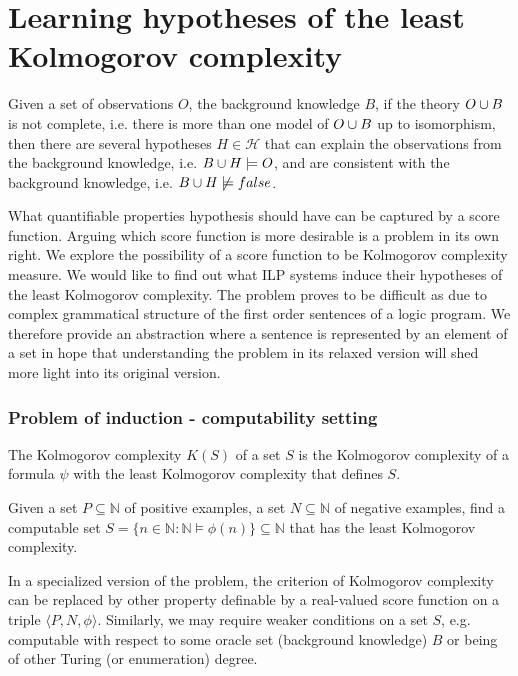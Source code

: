 \chapter{Learning hypotheses of the least Kolmogorov complexity}

Given a set of observations $O$, the background knowledge $B$, if the theory $O \cup B$ is not complete, i.e. there is more than one model of $O \cup B$ up to isomorphism, then there are several hypotheses $H \in \mathcal{H}$ that can explain the observations from the background knowledge, i.e. $B \cup H \models O$, and are consistent with the background knowledge, i.e. $B \cup H \not\models false$.

What quantifiable properties hypothesis should have can be captured by a score function. Arguing which score function is more desirable is a problem in its own right. We explore the possibility of a score function to be Kolmogorov complexity measure. We would like to find out what ILP systems induce their hypotheses of the least Kolmogorov complexity. The problem proves to be difficult as due to complex grammatical structure of the first order sentences of a logic program. We therefore provide an abstraction where a sentence is represented by an element of a set in hope that understanding the problem in its relaxed version will shed more light into its original version.

\subsection{Problem of induction - computability setting}

\begin{defn}
The Kolmogorov complexity $K(S)$ of a set $S$ is the Kolmogorov complexity
of a formula $\psi$ with the least Kolmogorov complexity that defines $S$.
\end{defn}

Given a set $P \subseteq \mathbb{N}$ of positive examples,
a set $N \subseteq \mathbb{N}$ of negative examples,
find a computable set $S = \{n \in \mathbb{N} : \mathbb{N} \models \phi(n) \} \subseteq \mathbb{N}$ that has the least Kolmogorov complexity.

In a specialized version of the problem, the criterion of Kolmogorov complexity can be replaced by other property definable by a real-valued score function on a triple $\langle P, N, \phi \rangle$. Similarly, we may require weaker conditions on a set $S$, e.g. computable with respect to some oracle set (background knowledge) $B$ or being of other Turing (or enumeration) degree.

